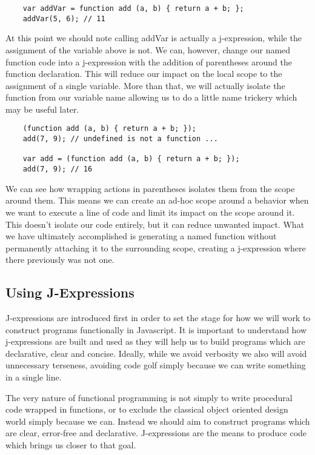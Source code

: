 \documentclass[a4paper,12pt,twoside]{book}
\begin{document}
\begin{lstlisting}
    var addVar = function add (a, b) { return a + b; };
    addVar(5, 6); // 11
\end{lstlisting}
 
 At this point we should note calling addVar is actually a j-expression, while the assignment of the variable above is not. We can, however, change our named function code into a j-expression with the addition of parentheses around the function declaration.  This will reduce our impact on the local scope to the assignment of a single variable.  More than that, we will actually isolate the function from our variable name allowing us to do a little name trickery which may be useful later.
 
\begin{lstlisting}
    (function add (a, b) { return a + b; });
    add(7, 9); // undefined is not a function ...
    
    var add = (function add (a, b) { return a + b; });
    add(7, 9); // 16
\end{lstlisting} 
 
 We can see how wrapping actions in parentheses isolates them from the scope around them. This means we can create an ad-hoc scope around a behavior when we want to execute a line of code and limit its impact on the scope around it. This doesn't isolate our code entirely, but it can reduce unwanted impact. What we have ultimately accomplished is generating a named function without permanently attaching it to the surrounding scope, creating a j-expression where there previously was not one.
 
\subsection{Using J-Expressions}
 
 J-expressions are introduced first in order to set the stage for how we will work to construct programs functionally in Javascript.  It is important to understand how j-expressions are built and used as they will help us to build programs which are declarative, clear and concise.  Ideally, while we avoid verbosity we also will avoid unnecessary terseness, avoiding code golf simply because we can write something in a single line.
 
 The very nature of functional programming is not simply to write procedural code wrapped in functions, or to exclude the classical object oriented design world simply because we can. Instead we should aim to construct programs which are clear, error-free and declarative. J-expressions are the means to produce code which brings us closer to that goal.
 
\end{document}
